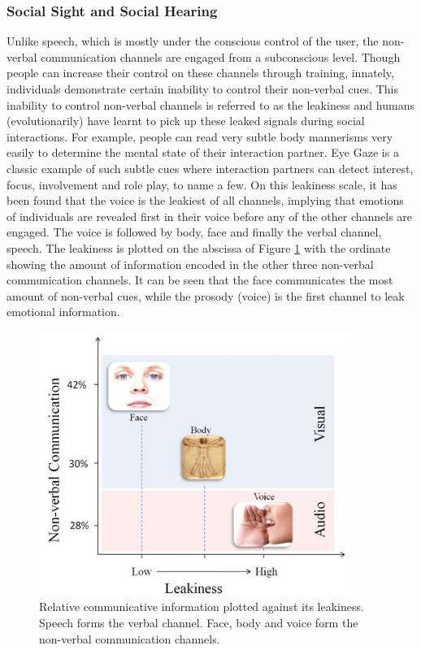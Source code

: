 \documentclass[oneside,11pt]{memoir}
\begin{document}
\subsubsection{Social Sight and Social Hearing}
Unlike speech, which is mostly under the conscious control of the user, the non-verbal communication channels are engaged from a subconscious level. Though people can increase their control on these channels through training, innately, individuals demonstrate certain inability to control their non-verbal cues. This inability to control non-verbal channels is referred to as the leakiness \cite{brown_social_1986} and humans (evolutionarily) have learnt to pick up these leaked signals during social interactions. For example, people can read very subtle body mannerisms very easily to determine the mental state of their interaction partner. Eye Gaze is a classic example of such subtle cues where interaction partners can detect interest, focus, involvement and role play, to name a few.  On this leakiness scale, it has been found that the voice is the leakiest of all channels, implying that emotions of individuals are revealed first in their voice before any of the other channels are engaged. The voice is followed by body, face and finally the verbal channel, speech. The leakiness is plotted on the abscissa of Figure \ref{Fig:Figure2} with the ordinate showing the amount of information encoded in the other three non-verbal communication channels. It can be seen that the face communicates the most amount of non-verbal cues, while the prosody (voice) is the first channel to leak emotional information.

\begin{figure}[h]
\begin{center}
 \includegraphics[width=4in]{Leakiness.jpg}
\caption{Relative communicative information plotted against its leakiness. Speech forms the verbal channel. Face, body and voice form the non-verbal communication channels.}
\label{Fig:Figure2}
\end{center}
\end{figure}
\end{document}
